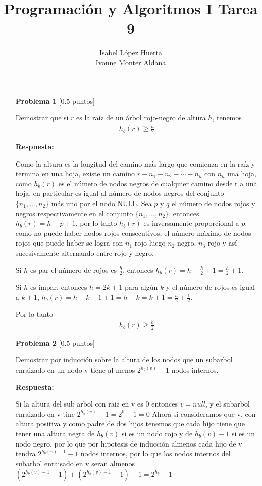 \documentclass[11pt]{article}
\title{Programación y Algoritmos I Tarea 9}
\author{Isabel López Huerta\\Ivonne Monter Aldana}
\begin{document}
\maketitle

\begin{itemize}
 \item [\textbf{Problema 1}] [0.5 puntos]

Demostrar que si $r$ es la raíz de un árbol rojo-negro de altura $h$, tenemos 
\begin{align*}
h_b(r)\geq \frac{h}{2}
\end{align*}

\textbf{Respuesta:}

Como la altura es la longitud del camino más largo que comienza en la raíz y termina en una hoja, existe un camino $r-n_1-n_2-\cdots-n_h$ con $n_h$ una hoja, como $h_b(r)$ es el número de nodos negros de cualquier camino desde r a una hoja, en particular es igual al número de nodos negros del conjunto 
$\{n_1,\ldots,n_2\}$ más uno por el nodo NULL. Sea $p$ y $q$ el número de nodos rojos y negros respectivamente en el conjunto $\{n_1,\ldots,n_2\}$, entonces $h_b(r)=h-p+1$, por lo tanto $h_b(r)$ es inversamente proporcional a $p$, como no puede haber nodos rojos consecutivos, el número máximo de nodos rojos que puede haber se logra con $n_1$ rojo luego $n_2$ negro, $n_3$ rojo y así sucesivamente alternando entre rojo y negro. 

Si $h$ es par el número de rojos es $\frac{h}{2}$, entonces $h_b(r)=h-\frac{h}{2}+1=\frac{h}{2}+1$.

Si $h$ es impar, entonces $h=2k+1$ para algún $k$ y el número de rojos es igual a $k+1$, 
$h_b(r)=h-k-1+1=h-k=k+1=\frac{h}{2}+\frac{1}{2}$.

Por lo tanto
\begin{align*}
h_b(r)\geq \frac{h}{2}
\end{align*}

 \item [\textbf{Problema 2}] [0.5 puntos]

Demostrar por inducción sobre la altura de los nodos que un subarbol enraizado en un nodo v tiene
al menos $2^{h_b(v)} - 1$ nodos internos.

\textbf{Respuesta:}

Si la altura del sub arbol con raiz en v es 0 entonces $v=null$, y el subarbol enraizado en v tine $2^{h_b(v)} - 1=2^0-1=0$
Ahora si consideramos que v, con altura positiva y como padre de dos hijos tenemos que cada hijo tiene que tener una altura negra de  $h_b(v)$ si es un nodo rojo y de $h_b(v)-1$ si es un nodo negro, por lo que por hipotesis de inducción almenos cada hijo de v tendra $2^{h_b(v)-1} - 1$ nodos internos, por lo que los nodos internos del subarbol enraisado en v seran almenos $(2^{h_b(v)-1} - 1)+(2^{h_b(v)-1} - 1)+1=2^{h_b}-1$\blacksquare


\end{itemize}
\end{document}
